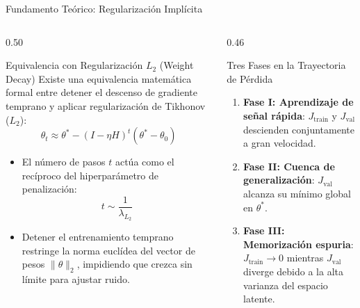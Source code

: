 \documentclass[10pt,aspectratio=169]{beamer}
\begin{document}
\begin{frame}{Fundamento Teórico: Regularización Implícita}
  \begin{columns}[T]
    \begin{column}{0.50\textwidth}
      \begin{block}{Equivalencia con Regularización $L_2$ (Weight Decay)}
        \scriptsize
        Existe una equivalencia matemática formal entre detener el descenso de gradiente temprano y aplicar regularización de Tikhonov ($L_2$):
        \[
          \theta_t \approx \theta^* - (I - \eta H)^t (\theta^* - \theta_0)
        \]
        \begin{itemize}
          \item El número de pasos $t$ actúa como el recíproco del hiperparámetro de penalización:
          \[
            t \sim \frac{1}{\lambda_{L_2}}
          \]
          \item Detener el entrenamiento temprano restringe la norma euclídea del vector de pesos $\|\theta\|_2$, impidiendo que crezca sin límite para ajustar ruido.
        \end{itemize}
      \end{block}
    \end{column}

    \begin{column}{0.46\textwidth}
      \begin{alertblock}{Tres Fases en la Trayectoria de Pérdida}
        \scriptsize
        \begin{enumerate}
          \item \textbf{Fase I: Aprendizaje de señal rápida}: $J_{\text{train}}$ y $J_{\text{val}}$ descienden conjuntamente a gran velocidad.
          \item \textbf{Fase II: Cuenca de generalización}: $J_{\text{val}}$ alcanza su mínimo global en $\theta^*$.
          \item \textbf{Fase III: Memorización espuria}: $J_{\text{train}} \to 0$ mientras $J_{\text{val}}$ diverge debido a la alta varianza del espacio latente.
        \end{enumerate}
      \end{alertblock}
    \end{column}
  \end{columns}
\end{frame}
\end{document}

